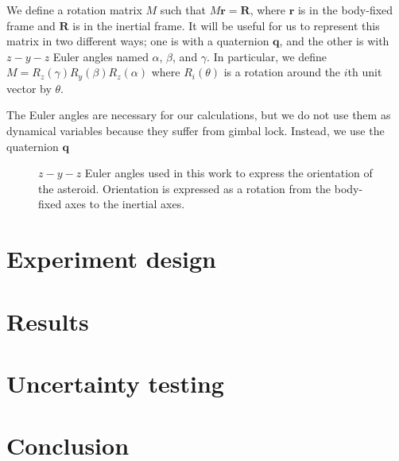 \documentclass[11pt]{article}
\newcommand{\unit}[1]{\hat{\mathbf{#1}}}
\begin{document}
We define a rotation matrix $M$ such that $M\bm{r} = \bm{R}$, where $\bm{r}$ is in the body-fixed frame and $\bm{R}$ is in the inertial frame. It will be useful for us to represent this matrix in two different ways; one is with a quaternion $\bm q$, and the other is with $z-y-z$ Euler angles named $\alpha$, $\beta$, and $\gamma$. In particular, we define $M = R_z(\gamma) R_y(\beta) R_z(\alpha)$ where $R_i(\theta)$ is a rotation around the $i$th unit vector by $\theta$.

The Euler angles are necessary for our calculations, but we do not use them as dynamical variables because they suffer from gimbal lock. Instead, we use the quaternion $\bm q$

\begin{figure}
\centering
{}
\caption{$z-y-z$ Euler angles used in this work to express the orientation of the asteroid. Orientation is expressed as a rotation from the body-fixed axes to the inertial axes.}
\label{fig:euler-angles}
\end{figure}


\section{Experiment design}


\section{Results}


\section{Uncertainty testing}


\section{Conclusion}



\end{document}
